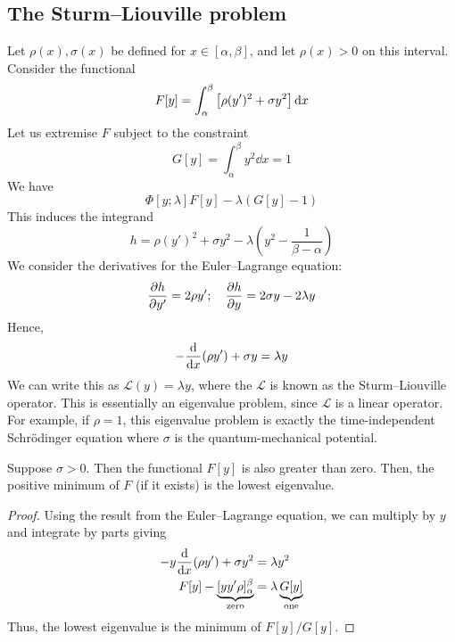 \subsection{The Sturm--Liouville problem}
Let \( \rho(x), \sigma(x) \) be defined for \( x \in [\alpha, \beta] \), and let \( \rho(x) > 0 \) on this interval.
Consider the functional
\[
	F[y] = \int_\alpha^\beta \qty[ \rho (y')^2 + \sigma y^2 ]\dd{x}
\]
Let us extremise \( F \) subject to the constraint
\[
	G[y] = \int_\alpha^\beta y^2 \dd{x} = 1
\]
We have
\[
	\Phi[y;\lambda]  F[y] - \lambda (G[y] - 1)
\]
This induces the integrand
\[
	h = \rho (y')^2 + \sigma y^2 - \lambda (y^2 - \frac{1}{\beta - \alpha})
\]
We consider the derivatives for the Euler--Lagrange equation:
\[
	\pdv{h}{y'} = 2 \rho y';\quad \pdv{h}{y} = 2 \sigma y - 2 \lambda y
\]
Hence,
\[
	-\dv{x}\qty(\rho y') + \sigma y = \lambda y
\]
We can write this as \( \mathcal L(y) = \lambda y \), where the \( \mathcal L \) is known as the Sturm--Liouville operator.
This is essentially an eigenvalue problem, since \( \mathcal L \) is a linear operator.
For example, if \( \rho = 1 \), this eigenvalue problem is exactly the time-independent Schr\"odinger equation where \( \sigma \) is the quantum-mechanical potential.

Suppose \( \sigma > 0 \).
Then the functional \( F[y] \) is also greater than zero.
Then, the positive minimum of \( F \) (if it exists) is the lowest eigenvalue.
\begin{proof}
	Using the result from the Euler--Lagrange equation, we can multiply by \( y \) and integrate by parts giving
	\begin{align*}
		-y\dv{x}\qty(\rho y') + \sigma y^2                         & = \lambda y^2                            \\
		F[y] - \underbrace{[y y' \rho]_\alpha^\beta}_{\text{zero}} & = \lambda \underbrace{G[y]}_{\text{one}}
	\end{align*}
	Thus, the lowest eigenvalue is the minimum of \( F[y] / G[y] \).
\end{proof}

